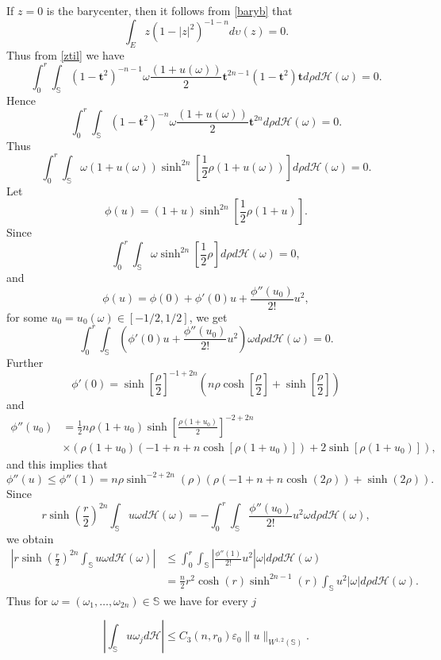 \documentclass[11pt]{amsart}
\numberwithin{equation}{section}
\begin{document}
If $z=0$ is the barycenter, then it follows from \eqref{baryb} that
$$\int_E z (1-|z|^2)^{-1-n} d\upsilon(z)=0.$$
Thus from \eqref{ztil} we have $$ \int_0^{r} \int_{\mathbb{S}}(1-{\mathbf{t}}^2)^{-n-1} \omega \frac{(1+u(\omega))}{2}{\mathbf{t}}^{2n-1}(1-\mathbf{t}^2)  \mathbf{t}d\rho d\mathcal{H}(\omega)=0.$$
Hence
$$ \int_0^{r} \int_{\mathbb{S}}(1-\mathbf{t}^2)^{-n} \omega \frac{(1+u(\omega))}{2}\mathbf{t}^{2n}  d\rho d\mathcal{H}(\omega)=0.$$
Thus $$\int_0^{r} \int_{\mathbb{S}}\omega(1+u(\omega))\sinh^{2n}\left[\frac{1}{2} \rho  (1+u(\omega ))\right]d\rho d\mathcal{H}(\omega)=0.$$
Let $$\phi(u)=(1+u)\sinh^{2n}\left[\frac{1}{2} \rho  (1+u)\right]. $$
Since $$\int_0^{r} \int_{\mathbb{S}}\omega\sinh^{2n}\left[\frac{1}{2} \rho  \right]d\rho d\mathcal{H}(\omega)=0,$$ and  $$ \phi(u) = \phi(0)+\phi'(0)u + \frac{\phi''(u_0)}{2!} u^2, $$ for some $u_0=u_0(\omega)\in[-1/2,1/2]$,
we get  $$\int_0^{r} \int_{\mathbb{S}} (\phi'(0)u + \frac{\phi''(u_0)}{2!} u^2)\omega d\rho d\mathcal{H}(\omega)=0.$$
Further
$$\phi'(0)=\sinh \left[\frac{\rho}{2}\right]^{-1+2 n} \left(n \rho \cosh \left[\frac{\rho}{2}\right]+\sinh \left[\frac{\rho}{2}\right]\right)$$
and
\[\begin{split}\phi''(u_0)&= \frac{1}{2} n \rho(1+u_0) \sinh \left[\frac{\rho(1+u_0)}{2}\right]^{-2+2 n} \\ & \times(\rho(1+u_0) (-1+n+n \cosh [\rho(1+u_0)])+2 \sinh [\rho(1+u_0)]),\end{split}\]
and this implies that
$$\phi''(u)\le \phi''(1)=n \rho \sinh^{-2+2 n}(\rho)  (\rho(-1+n+n \cosh(2 \rho))+\sinh(2\rho)).$$
Since
$$r \sinh(\frac{r}{2})^{2 n} \int_{\mathbb{S}} u \omega d\mathcal{H}(\omega) = -\int_0^{r} \int_{\mathbb{S}}\frac{\phi''(u_0)}{2!} u^2\omega d\rho d\mathcal{H}(\omega),$$
 we obtain
 \[\begin{split}
 |r \sinh(\frac{r}{2})^{2 n} \int_{\mathbb{S}} u \omega d\mathcal{H}(\omega)|&\le \int_0^{r} \int_{\mathbb{S}}|\frac{\phi''(1)}{2!} u^2|\omega| d\rho d\mathcal{H}(\omega)
  \\&=\frac{n}{2} r^2 \cosh(r) \sinh^{2n-1}(r) \int_{\mathbb{S}} u^2|\omega| d\rho d\mathcal{H}(\omega).\end{split}\]
Thus for $\omega=(\omega_1,\dots,\omega_{2n})\in \mathbb{S}$ we have for every $j$

\begin{equation}\label{estuom1}\left|\int_{\mathbb{S}} u \omega_j d\mathcal{H} \right|\le C_3(n,r_0)\varepsilon_0\|u\|_{W^{1,2}(\mathbb{S})}.\end{equation}
\end{document}
